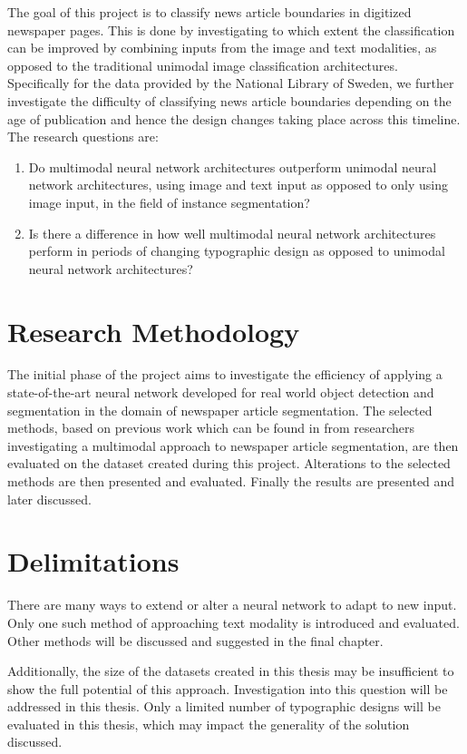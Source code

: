 \documentclass[oneside, english, bibtex]{kththesis}
\begin{document}
The goal of this project is to classify news article boundaries in digitized newspaper pages. This is done by investigating to which extent the classification can be improved by combining inputs from the image and text modalities, as opposed to the traditional unimodal image classification architectures. Specifically for the data provided by the National Library of Sweden, we further investigate the difficulty of classifying news article boundaries depending on the age of publication and hence the design changes taking place across this timeline. The research questions are:

\begin{enumerate}
\item Do multimodal neural network architectures outperform unimodal neural network architectures, using image and text input as opposed to only using image input, in the field of instance segmentation?
\item Is there a difference in how well multimodal neural network architectures perform in periods of changing typographic design as opposed to unimodal neural network architectures?
\end{enumerate}

\section{Research Methodology}

The initial phase of the project aims to investigate the efficiency of applying a state-of-the-art neural network developed for real world object detection and segmentation in the domain of newspaper article segmentation.
The selected methods, based on previous work which can be found in  from researchers investigating a multimodal approach to newspaper article segmentation, are then evaluated on the dataset created during this project.
Alterations to the selected methods are then presented and evaluated. Finally the results are presented and later discussed.

\section{Delimitations}

There are many ways to extend or alter a neural network to adapt to new input. Only one such method of approaching text modality is introduced and evaluated. Other methods will be discussed and suggested in the final chapter.

Additionally, the size of the datasets created in this thesis may be insufficient to show the full potential of this approach.
Investigation into this question will be addressed in this thesis.
Only a limited number of typographic designs will be evaluated in this thesis, which may impact the generality of the solution discussed.
\end{document}
